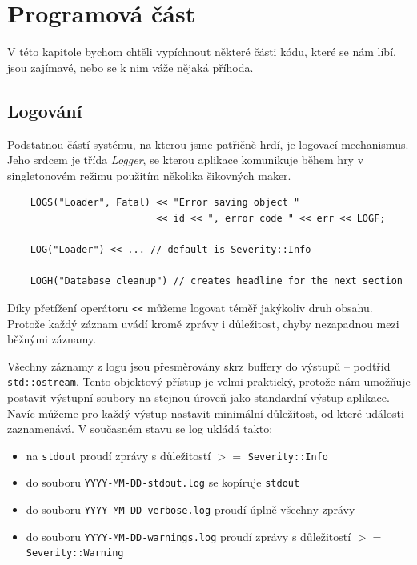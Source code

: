 \documentclass[11pt, a4paper]{article}
\def\class#1{\emph{#1}}
\begin{document}
\section{Programová část}

V této kapitole bychom chtěli vypíchnout některé části kódu, které se nám líbí, jsou zajímavé, nebo se k nim váže nějaká příhoda.

\subsection{Logování}

Podstatnou částí systému, na kterou jsme patřičně hrdí, je logovací mechanismus. Jeho srdcem je třída \class{Logger}, se kterou aplikace komunikuje během hry v singletonovém režimu použitím několika šikovných maker.

\begin{lstlisting}
	LOGS("Loader", Fatal) << "Error saving object "
	                      << id << ", error code " << err << LOGF;
	                      
    LOG("Loader") << ... // default is Severity::Info
    
    LOGH("Database cleanup") // creates headline for the next section
\end{lstlisting} 

\noindent
Díky přetížení operátoru \texttt{<<} můžeme logovat téměř jakýkoliv druh obsahu. Protože každý záznam uvádí kromě zprávy i důležitost, chyby nezapadnou mezi běžnými záznamy.

Všechny záznamy z logu jsou přesměrovány skrz buffery do výstupů – podtříd \texttt{std::ostream}. Tento objektový přístup je velmi praktický, protože nám umožňuje postavit výstupní soubory na stejnou úroveň jako standardní výstup aplikace. Navíc můžeme pro každý výstup nastavit minimální důležitost, od které události zaznamenává. V současném stavu se log ukládá takto:

\begin{itemize}
\item na \texttt{stdout} proudí zprávy s důležitostí $>=$ \texttt{Severity::Info}
\item do souboru \texttt{YYYY-MM-DD-stdout.log} se kopíruje \texttt{stdout}
\item do souboru \texttt{YYYY-MM-DD-verbose.log} proudí úplně všechny zprávy
\item do souboru \texttt{YYYY-MM-DD-warnings.log} proudí zprávy s důležitostí $>=$ \texttt{Severity::Warning}
\end{itemize}
\end{document}
